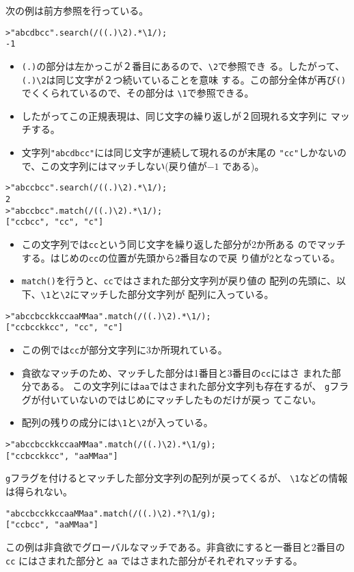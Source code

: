 \begin{Exec}\upshape
次の例は前方参照を行っている。
\begin{Verbatim}
>"abcdbcc".search(/((.)\2).*\1/);
-1
\end{Verbatim}
\begin{itemize}
 \item \Verb+(.)+の部分は左かっこが２番目にあるので、\Verb+\2+で参照でき
       る。したがって、\Verb+(.)\2+は同じ文字が２つ続いていることを意味
       する。この部分全体が再び\Verb+()+でくくられているので、その部分は
       \Verb+\1+で参照できる。
 \item したがってこの正規表現は、同じ文字の繰り返しが２回現れる文字列に
       マッチする。
 \item 文字列\Verb+"abcdbcc"+には同じ文字が連続して現れるのが末尾の
       \Verb+"cc"+しかないので、この文字列にはマッチしない(戻り値が$-1$
       である)。
\end{itemize}
\begin{Verbatim}
>"abccbcc".search(/((.)\2).*\1/);
2
>"abccbcc".match(/((.)\2).*\1/);
["ccbcc", "cc", "c"]
\end{Verbatim}
\begin{itemize}
 \item この文字列では\Verb+cc+という同じ文字を繰り返した部分が2か所ある
       のでマッチする。はじめの\Verb+cc+の位置が先頭から$2$番目なので戻
       り値が$2$となっている。
 \item \Verb+match()+を行うと、\Verb+cc+ではさまれた部分文字列が戻り値の
       配列の先頭に、以下、\Verb+\1+と\Verb+\2+にマッチした部分文字列が
       配列に入っている。
\end{itemize}
\begin{Verbatim}
>"abccbcckkccaaMMaa".match(/((.)\2).*\1/);
["ccbcckkcc", "cc", "c"]
\end{Verbatim}
\begin{itemize}
 \item この例では\Verb+cc+が部分文字列に3か所現れている。
 \item 貪欲なマッチのため、マッチした部分は1番目と3番目の\Verb+cc+にはさ
       まれた部分である。
       この文字列には\Verb+aa+ではさまれた部分文字列も存在するが、
       \Verb+g+フラグが付いていないのではじめにマッチしたものだけが戻っ
       てこない。
 \item 配列の残りの成分には\Verb+\1+と\Verb+\2+が入っている。
\end{itemize}
\begin{Verbatim}
>"abccbcckkccaaMMaa".match(/((.)\2).*\1/g);
["ccbcckkcc", "aaMMaa"]
\end{Verbatim}
 \Verb+g+フラグを付けるとマッチした部分文字列の配列が戻ってくるが、
 \Verb+\1+などの情報は得られない。
\begin{Verbatim}
"abccbcckkccaaMMaa".match(/((.)\2).*?\1/g);
["ccbcc", "aaMMaa"]
\end{Verbatim}
この例は非貪欲でグローバルなマッチである。非貪欲にすると一番目と2番目の
 \Verb+cc+ にはさまれた部分と \Verb+aa+ ではさまれた部分がそれぞれマッチする。


\end{Exec}
